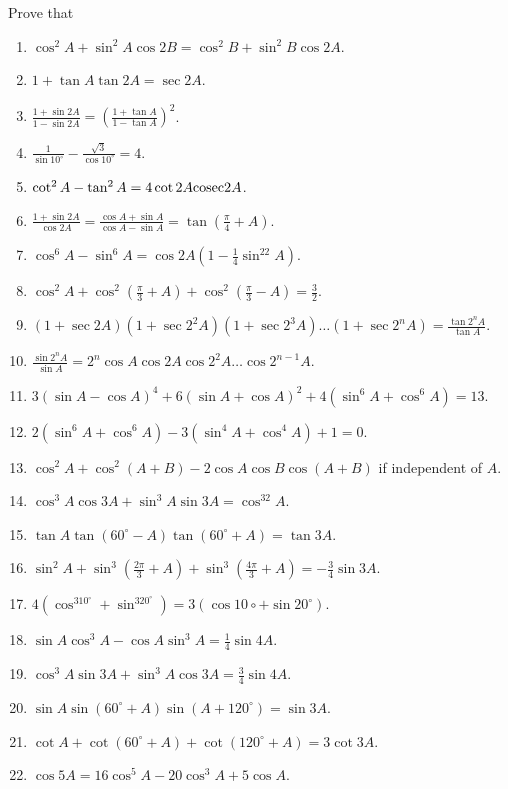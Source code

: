 Prove that

\begin{enumerate}[resume]
\item $\cos^2A + \sin^2A\cos 2B = \cos^2B + \sin^2B\cos 2A$.
\item $1 + \tan A\tan 2A = \sec 2A$.
\item $\frac{1 + \sin 2A}{1 - \sin 2A} = \left(\frac{1 + \tan A}{1 - \tan A}\right)^2$.
\item $\frac{1}{\sin 10^\circ} - \frac{\sqrt{3}}{\cos 10^\circ} = 4$.
\item $\cot^2A - \tan^2A = 4\cot2A{\rm cosec} 2A$.
\item $\frac{1 +\sin 2A}{\cos2A} = \frac{\cos A + \sin A}{\cos A - \sin A} = \tan\left(\frac{\pi}{4} + A\right)$.
\item $\cos^6A - \sin^6A = \cos2A\left(1 - \frac{1}{4}\sin^22A\right)$.
\item $\cos^2A + \cos^2\left(\frac{\pi}{3} + A\right) + \cos^2\left(\frac{\pi}{3} - A\right)= \frac{3}{2}$.
\item $(1 + \sec2A)(1 + \sec2^2A)(1 + \sec2^3A) \ldots (1 + \sec2^nA) = \frac{\tan2^nA}{\tan A}$.
\item $\frac{\sin2^nA}{\sin A} = 2^n\cos A\cos 2A\cos 2^2A\ldots\cos2^{n - 1}A$.
\item $3(\sin A - \cos A)^4 + 6(\sin A + \cos A)^2 + 4(\sin^6A + \cos^6A) = 13$.
\item $2(\sin^6A + \cos^6A) - 3(\sin^4A + \cos^4A) + 1 = 0$.
\item $\cos^2A + \cos^2(A + B) -2\cos A\cos B\cos(A + B)$ if independent of $A$.
\item $\cos^3A\cos 3A + \sin^3A\sin 3A = \cos^32A$.
\item $\tan A\tan(60^\circ - A)\tan(60^\circ + A) = \tan 3A$.
\item $\sin^2A + \sin^3\left(\frac{2\pi}{3} + A\right) + \sin^3\left(\frac{4\pi}{3} + A\right) = -\frac{3}{4}\sin 3A$.
\item $4(\cos^310^\circ + \sin^320^\circ) = 3(\cos 10\circ + \sin 20^\circ)$.
\item $\sin A\cos^3A - \cos A\sin^3A = \frac{1}{4}\sin 4A$.
\item $\cos^3A\sin3A + \sin^3A\cos 3A = \frac{3}{4}\sin 4A$.
\item $\sin A\sin(60^\circ + A)\sin(A + 120^\circ) = \sin 3A$.
\item $\cot A + \cot(60^\circ + A) + \cot(120^\circ + A) = 3\cot 3A$.
\item $\cos 5A = 16\cos^5A - 20\cos^3A + 5\cos A$.

\end{enumerate}
